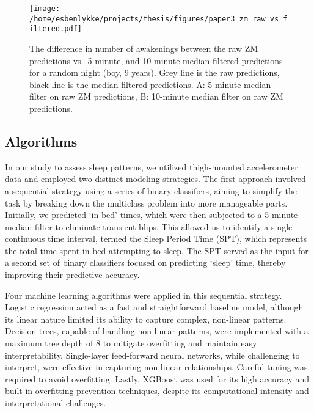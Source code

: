 \documentclass[
  9pt,
]{scrbook}
\begin{document}
\begin{figure}

{\centering \texttt{[image: /home/esbenlykke/projects/thesis/figures/paper3\_zm\_raw\_vs\_filtered.pdf]}

}

\caption{\label{fig-paper3_raw_filt}The difference in number of
awakenings between the raw ZM predictions vs.~5-minute, and 10-minute
median filtered predictions for a random night (boy, 9 years). Grey line
is the raw predictions, black line is the median filtered predictions.
A: 5-minute median filter on raw ZM predictions, B: 10-minute median
filter on raw ZM predictions.}

\end{figure}

\hypertarget{algorithms}{%
\subsection{Algorithms}\label{algorithms}}

In our study to assess sleep patterns, we utilized thigh-mounted
accelerometer data and employed two distinct modeling strategies. The
first approach involved a sequential strategy using a series of binary
classifiers, aiming to simplify the task by breaking down the multiclass
problem into more manageable parts. Initially, we predicted `in-bed'
times, which were then subjected to a 5-minute median filter to
eliminate transient blips. This allowed us to identify a single
continuous time interval, termed the Sleep Period Time (SPT), which
represents the total time spent in bed attempting to sleep. The SPT
served as the input for a second set of binary classifiers focused on
predicting `sleep' time, thereby improving their predictive accuracy.

Four machine learning algorithms were applied in this sequential
strategy. Logistic regression acted as a fast and straightforward
baseline model, although its linear nature limited its ability to
capture complex, non-linear patterns. Decision trees, capable of
handling non-linear patterns, were implemented with a maximum tree depth
of 8 to mitigate overfitting and maintain easy interpretability.
Single-layer feed-forward neural networks, while challenging to
interpret, were effective in capturing non-linear relationships. Careful
tuning was required to avoid overfitting. Lastly, XGBoost was used for
its high accuracy and built-in overfitting prevention techniques,
despite its computational intensity and interpretational challenges.
\end{document}
